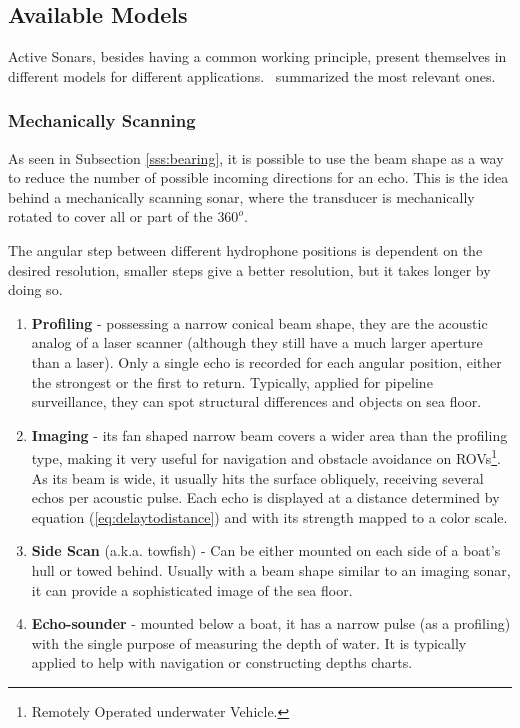 \subsection{Available Models}
\label{ss:avaible_models}
 
Active Sonars, besides having a common working principle, present themselves in
different models for different applications.~\citet{sonars:16} summarized the
most relevant ones.

\subsubsection{Mechanically Scanning}

As seen in Subsection \ref{sss:bearing}, it is possible to use the beam shape as
a way to reduce the number of possible incoming directions for an echo. This is
the idea behind a mechanically scanning sonar, where the transducer is
mechanically rotated to cover all or part of the $360^o$.

The angular step between different hydrophone positions is dependent on the
desired resolution, smaller steps give a better resolution, but it takes longer
by doing so.

\begin{enumerate}
  \item \textbf{Profiling} - possessing a narrow conical beam shape, they are the
  acoustic analog of a laser scanner (although they still have a much larger
  aperture than a laser). Only a single echo is recorded for each angular
  position, either the strongest or the first to return. Typically, applied for
  pipeline surveillance, they can spot structural differences and objects on
  sea floor.
  \item \textbf{Imaging} - its fan shaped narrow beam covers a wider area than
  the profiling type, making it very useful for navigation and obstacle
  avoidance on ROVs\footnote{Remotely Operated underwater Vehicle.}. As its beam
  is wide, it usually hits the surface obliquely, receiving several echos per
  acoustic pulse. Each echo is displayed at a distance determined by equation
  (\ref{eq:delaytodistance}) and with its strength mapped to a color scale.
  \item \textbf{Side Scan} (a.k.a. towfish) - Can be either mounted on each side
  of a boat's hull or towed behind. Usually with a beam shape similar to an
  imaging sonar, it can provide a sophisticated image of the sea floor.
  \item \textbf{Echo-sounder} - mounted below a boat, it has a narrow pulse
  (as a profiling) with the single purpose of measuring the depth of water. It
  is typically applied to help with navigation or constructing depths charts.
\end{enumerate}

